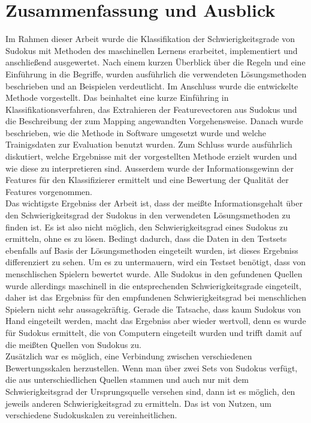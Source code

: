 \chapter{Zusammenfassung und Ausblick}
\label{Zusammenfassung}
Im Rahmen dieser Arbeit wurde die Klassifikation der Schwierigkeitsgrade von Sudokus mit Methoden des maschinellen Lernens erarbeitet, implementiert und anschließend ausgewertet. Nach einem kurzen Überblick über die Regeln und eine Einführung in die Begriffe, wurden ausführlich die verwendeten Lösungsmethoden beschrieben und an Beispielen verdeutlicht. Im Anschluss wurde die entwickelte Methode vorgestellt. Das beinhaltet eine kurze Einführing in Klassifikationsverfahren, das Extrahieren der Featurevectoren aus Sudokus und die Beschreibung der zum Mapping angewandten Vorgehensweise. Danach wurde beschrieben, wie die Methode in Software umgesetzt wurde und welche Trainigsdaten zur Evaluation benutzt wurden. Zum Schluss wurde ausführlich diskutiert, welche Ergebnisse mit der vorgestellten Methode erzielt wurden und wie diese zu interpretieren sind. Ausserdem wurde der Informationsgewinn der Features für den Klassifizierer ermittelt und eine Bewertung der Qualität der Features vorgenommen.\\
Das wichtigste Ergebniss der Arbeit ist, dass der meißte Informationsgehalt über den Schwierigkeitsgrad der Sudokus in den verwendeten Lösungsmethoden zu finden ist. Es ist also nicht möglich, den Schwierigkeitsgrad eines Sudokus zu ermitteln, ohne es zu lösen. Bedingt dadurch, dass die Daten in den Testsets ebenfalls auf Basis der Lösungsmethoden eingeteilt wurden, ist dieses Ergebniss differenziert zu sehen. Um es zu untermauern, wird ein Testset benötigt, dass von menschlischen Spielern bewertet wurde. Alle Sudokus in den gefundenen Quellen wurde allerdings maschinell in die entsprechenden Schwierigkeitsgrade eingeteilt, daher ist das Ergebniss für den empfundenen Schwierigkeitsgrad bei menschlichen Spielern nicht sehr aussagekräftig. Gerade die Tatsache, dass kaum Sudokus von Hand eingeteilt werden, macht das Ergebniss aber wieder wertvoll, denn es wurde für Sudokus ermittelt, die von Computern eingeteilt wurden und trifft damit auf die meißten Quellen von Sudokus zu.\\
Zusätzlich war es möglich, eine Verbindung zwischen verschiedenen Bewertungsskalen herzustellen. Wenn man über zwei Sets von Sudokus verfügt, die aus unterschiedlichen Quellen stammen und auch nur mit dem Schwierigkeitsgrad der Ursprungsquelle versehen sind, dann ist es möglich, den jeweils anderen Schwierigkeitsgrad zu ermitteln. Das ist von Nutzen, um verschiedene Sudokuskalen zu vereinheitlichen.\\

